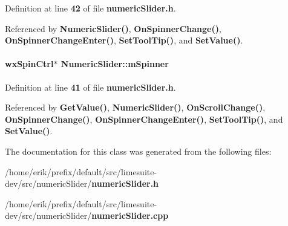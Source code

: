 Definition at line {\bf 42} of file {\bf numeric\+Slider.\+h}.



Referenced by {\bf Numeric\+Slider()}, {\bf On\+Spinner\+Change()}, {\bf On\+Spinner\+Change\+Enter()}, {\bf Set\+Tool\+Tip()}, and {\bf Set\+Value()}.

\paragraph[{m\+Spinner}]{\setlength{\rightskip}{0pt plus 5cm}wx\+Spin\+Ctrl$\ast$ Numeric\+Slider\+::m\+Spinner\hspace{0.3cm}{\ttfamily [protected]}}\label{classNumericSlider_a34b93565eb697f3f6f0d07cae8dc74f0}


Definition at line {\bf 41} of file {\bf numeric\+Slider.\+h}.



Referenced by {\bf Get\+Value()}, {\bf Numeric\+Slider()}, {\bf On\+Scroll\+Change()}, {\bf On\+Spinner\+Change()}, {\bf On\+Spinner\+Change\+Enter()}, {\bf Set\+Tool\+Tip()}, and {\bf Set\+Value()}.



The documentation for this class was generated from the following files\+:\begin{DoxyCompactItemize}
\item 
/home/erik/prefix/default/src/limesuite-\/dev/src/numeric\+Slider/{\bf numeric\+Slider.\+h}\item 
/home/erik/prefix/default/src/limesuite-\/dev/src/numeric\+Slider/{\bf numeric\+Slider.\+cpp}\end{DoxyCompactItemize}
